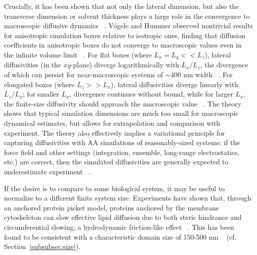 \documentclass[9pt,bestpractices,pubversion]{livecoms}
\begin{document}
Crucially, it has been shown that not only the lateral dimension, but also the transverse dimension or solvent thickness plays a large role in the convergence to macroscopic diffusive dynamics ~\cite{Venable2017}.
V\"ogele and Hummer observed nontrivial results for anisotropic simulation boxes relative to isotropic ones, finding that diffusion coefficients in anisotropic boxes do not converge to macroscopic values even in the infinite volume limit ~\cite{Vogele2016}.
For flat boxes (where $L_x = L_y << L_z$), lateral diffusivities (in the $xy$-plane) diverge logarithmically with $L_x/L_z$, the divergence of which can persist for near-macroscopic systems of $\sim$400 nm width ~\cite{Vogele2016}.
For elongated boxes (where $L_z >> L_x$), lateral diffusivities diverge linearly with $L_z/L_x$; for smaller $L_x$, divergence continues without bound, while for larger $L_x$, the finite-size diffusivity should approach the macroscopic value ~\cite{Vogele2016}.
The theory shows that typical simulation dimensions are much too small for macroscopic dynamical estimates, but allows for extrapolation and comparison with experiment.
The theory also effectively implies a variational principle for capturing diffusivities with AA simulations of reasonably-sized systems: if the force field and other settings (integration, ensemble, long-range electrostatics, etc.) are correct, then the simulated diffusivities are generally expected to underestimate experiment ~\cite{Venable2017}.

If the desire is to compare to some biological system, it may be useful to normalize to a different finite system size.
Experiments have shown that, through an anchored protein picket model, proteins anchored by the membrane cytoskeleton can slow effective lipid diffusion due to both steric hindrance and circumferential slowing, a hydrodynamic friction-like effect ~\cite{Morone2006}.
This has been found to be consistent with a characteristic domain size of 150-500 nm ~\cite{Ritchie2003,Morone2006} (cf. Section~\ref{subsubsec:size}).
\end{document}
